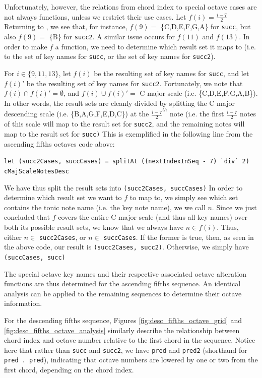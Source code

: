 \documentclass{report}
\begin{document}
Unfortunately, however, the relations from chord index to special octave cases are not always functions, unless we restrict their use cases. Let $f(i) = \frac{i-7}{2}$ Returning to , we see that, for instance, $f(9) =$ \{C,D,E,F,G,A\} for \verb.succ., but also $f(9) =$ \{B\} for \verb.succ2.. A similar issue occurs for $f(11)$ and $f(13)$. In order to make $f$ a function, we need to determine which result set it maps to (i.e. to the set of key names for \verb.succ., or the set of key names for \verb.succ2.). 

For $i \in \{9,11,13\}$, let $f(i)$ be the resulting set of key names for \verb.succ., and let $f(i)$' be the resulting set of key names for \verb.succ2.. Fortunately, we note that $f(i) \cap f(i)' = \emptyset$, and $f(i) \cup f(i)' = $ C major scale (i.e. \{C,D,E,F,G,A,B\}). In other words, the result sets are cleanly divided by splitting the C major descending scale (i.e. \{B,A,G,F,E,D,C\}) at the $\frac{i-7}{2}^{th}$ note (i.e. the first $\frac{i-7}{2}$ notes of this scale will map to the result set for  \verb.succ2., and the remaining notes will map to the result set for \verb.succ). This is exemplified in the following line from the ascending fifths octaves code above:

\verb.let (succ2Cases, succCases) = splitAt ((nextIndexInSeq - 7) `div` 2) cMajScaleNotesDesc.

We have thus split the result sets into \verb.(succ2Cases, succCases). In order to determine which result set we want to $f$ to map to, we simply see which set contains  the  tonic note name (i.e. the key note name), we we call $n$. Since we just concluded that $f$  covers the entire C major scale (and thus all key names) over both its possible result sets, we know that we always have  $n \in f(i)$. Thus, either $n \in$ \verb.succ2Cases., or $n \in$ \verb.succCases.. If the former is true, then, as seen in the above code, our result is \verb.(succ2Cases, succ2).. Otherwise, we simply have \verb.(succCases, succ). 

The special octave key names and their respective associated octave alteration functions are thus determined for the ascending fifths sequence. An identical analysis can be applied to the remaining sequences to determine their octave information.

For the descending fifths sequence, Figures \ref{fig:desc_fifths_octave_grid} and \ref{fig:desc_fifths_octave_analysis} similarly describe the relationship between chord index and octave number relative to the first chord in the sequence. Notice here that rather than \verb.succ. and \verb.succ2., we have \verb.pred. and \verb.pred2. (shorthand for \verb!pred . pred!), indicating that octave numbers are lowered by one or two from the first chord, depending on the chord index.
\end{document}
